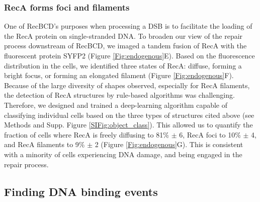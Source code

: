 \subsubsection*{RecA forms foci and filaments}
One of RecBCD's purposes when processing a DSB is to facilitate the loading of the RecA protein on single-stranded DNA. To broaden our view of the repair process downstream of RecBCD, we imaged a tandem fusion of RecA with the fluorescent protein SYFP2 (Figure \ref{Fig:endogenous}E).\cite{Wiktor2021} Based on the fluorescence distribution in the cells, we identified three states of RecA: diffuse, forming a bright focus, or forming an elongated filament (Figure \ref{Fig:endogenous}F). Because of the large diversity of shapes observed, especially for RecA filaments, the detection of RecA structures by rule-based algorithms was challenging. Therefore, we designed and trained a deep-learning algorithm capable of classifying individual cells based on the three types of structures cited above (see Methods and Supp. Figure \ref{SIFig:object_class}). This allowed us to quantify the fraction of cells where RecA is freely diffusing to 81\% $\pm$ 6, RecA foci to 10\% $\pm$ 4, and RecA filaments to 9\% $\pm$ 2 (Figure \ref{Fig:endogenous}G). This is consistent with a minority of cells experiencing DNA damage, and being engaged in the repair process.

\subsection*{Finding DNA binding events}

